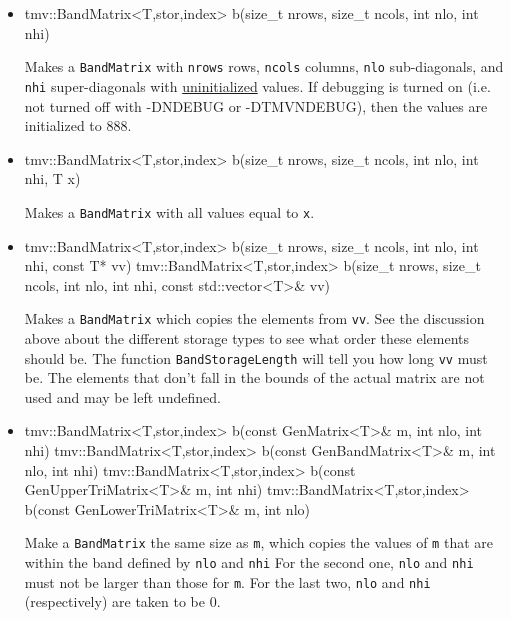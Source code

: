 \documentclass[twoside,letterpaper,11pt]{article}
\renewcommand{\tt}[1]{{\lstinline {#1}}}
\begin{document}
\begin{itemize}
\item 
\begin{tmvcode}
tmv::BandMatrix<T,stor,index> b(size_t nrows, size_t ncols, 
      int nlo, int nhi)
\end{tmvcode}
Makes a \tt{BandMatrix} with \tt{nrows} rows, \tt{ncols} columns, 
\tt{nlo} sub-diagonals,
and \tt{nhi} super-diagonals with \underline{uninitialized} values.
If debugging is turned on (i.e. not turned off 
with -DNDEBUG or -DTMVNDEBUG), then the values are initialized to 888.

\item
\begin{tmvcode}
tmv::BandMatrix<T,stor,index> b(size_t nrows, size_t ncols, 
      int nlo, int nhi, T x)
\end{tmvcode}
Makes a \tt{BandMatrix} with all values equal to \tt{x}.

\item
\begin{tmvcode}
tmv::BandMatrix<T,stor,index> b(size_t nrows, size_t ncols, 
      int nlo, int nhi, const T* vv)
tmv::BandMatrix<T,stor,index> b(size_t nrows, size_t ncols, 
      int nlo, int nhi, const std::vector<T>& vv)
\end{tmvcode}
Makes a \tt{BandMatrix} which copies the elements from \tt{vv}.  See the 
discussion above about the different storage types to see what order these elements
should be.  The function \tt{BandStorageLength} will tell you how
long \tt{vv} must be.  The elements that don't fall in the bounds of the 
actual matrix are not used and may be left undefined.

\item 
\begin{tmvcode}
tmv::BandMatrix<T,stor,index> b(const GenMatrix<T>& m, 
      int nlo, int nhi)
tmv::BandMatrix<T,stor,index> b(const GenBandMatrix<T>& m, 
      int nlo, int nhi)
tmv::BandMatrix<T,stor,index> b(const GenUpperTriMatrix<T>& m,
      int nhi)
tmv::BandMatrix<T,stor,index> b(const GenLowerTriMatrix<T>& m,
      int nlo)
\end{tmvcode}
Make a \tt{BandMatrix} the same size as \tt{m}, which copies the values of \tt{m}
that are within the band defined by \tt{nlo} and \tt{nhi}
For the second one, \tt{nlo} and \tt{nhi} must not be larger than those for \tt{m}.
For the last two, \tt{nlo} and \tt{nhi} (respectively) are taken to be $0$.


\end{itemize}
\end{document}
